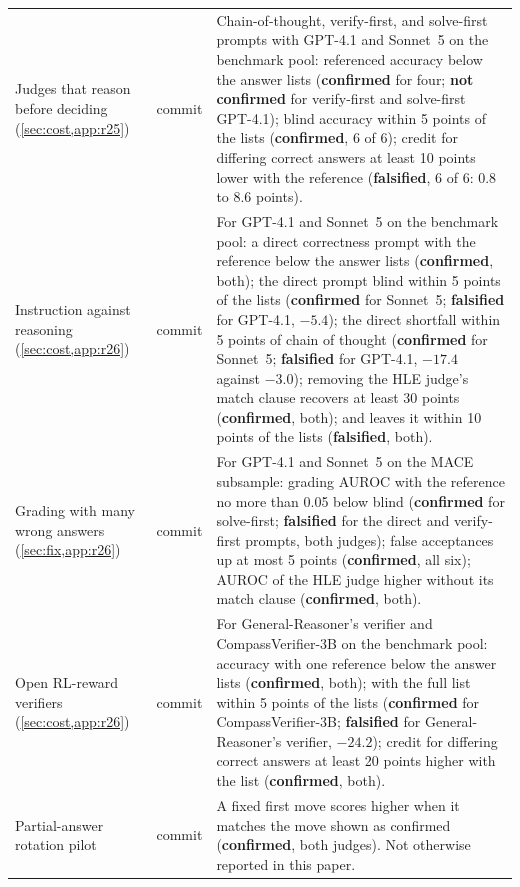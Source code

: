 {\begin{longtable}{L{3.2cm}L{1.1cm}L{8.7cm}}
Judges that reason before deciding (\cref{sec:cost,app:r25}) & commit & Chain-of-thought, verify-first, and solve-first prompts with GPT-4.1 and Sonnet~5 on the benchmark pool: referenced accuracy below the answer lists (\textbf{confirmed} for four; \textbf{not confirmed} for verify-first and solve-first GPT-4.1); blind accuracy within 5 points of the lists (\textbf{confirmed}, 6 of 6); credit for differing correct answers at least 10 points lower with the reference (\textbf{falsified}, 6 of 6: 0.8 to 8.6 points). \\
Instruction against reasoning (\cref{sec:cost,app:r26}) & commit & For GPT-4.1 and Sonnet~5 on the benchmark pool: a direct correctness prompt with the reference below the answer lists (\textbf{confirmed}, both); the direct prompt blind within 5 points of the lists (\textbf{confirmed} for Sonnet~5; \textbf{falsified} for GPT-4.1, $-5.4$); the direct shortfall within 5 points of chain of thought (\textbf{confirmed} for Sonnet~5; \textbf{falsified} for GPT-4.1, $-17.4$ against $-3.0$); removing the HLE judge's match clause recovers at least 30 points (\textbf{confirmed}, both); and leaves it within 10 points of the lists (\textbf{falsified}, both). \\
Grading with many wrong answers (\cref{sec:fix,app:r26}) & commit & For GPT-4.1 and Sonnet~5 on the \textsc{MACE} subsample: grading AUROC with the reference no more than 0.05 below blind (\textbf{confirmed} for solve-first; \textbf{falsified} for the direct and verify-first prompts, both judges); false acceptances up at most 5 points (\textbf{confirmed}, all six); AUROC of the HLE judge higher without its match clause (\textbf{confirmed}, both). \\
Open RL-reward verifiers (\cref{sec:cost,app:r26}) & commit & For General-Reasoner's verifier and CompassVerifier-3B on the benchmark pool: accuracy with one reference below the answer lists (\textbf{confirmed}, both); with the full list within 5 points of the lists (\textbf{confirmed} for CompassVerifier-3B; \textbf{falsified} for General-Reasoner's verifier, $-24.2$); credit for differing correct answers at least 20 points higher with the list (\textbf{confirmed}, both). \\
Partial-answer rotation pilot & commit & A fixed first move scores higher when it matches the move shown as confirmed (\textbf{confirmed}, both judges). Not otherwise reported in this paper. \\
\end{longtable}
}

